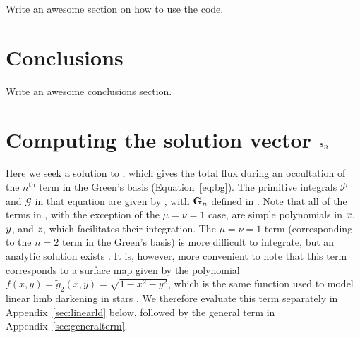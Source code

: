 \documentclass[modern]{aastex61}
\begin{document}
Write an awesome section on how to use the code.

%


\pagebreak
\section{Conclusions}
\label{sec:conclusions}

Write an awesome conclusions section.

%


\pagebreak
\appendix
\section{Computing the solution vector $\MakeLowercase{s_n}$}
\label{sec:solutionvector}

Here we seek a solution to , which gives the total flux
during an occultation of the $n^\mathrm{th}$ term in the Green's basis
(Equation~\ref{eq:bg}). The primitive integrals $\mathcal{P}$ and
$\mathcal{G}$ in that equation are given by , with
${\mathbf{G}}_n$ defined in . Note that all of the terms in ,
with the exception of the $\mu = \nu = 1$ case, are simple polynomials
in $\mbox{$x$}$, $\mbox{$y$}$, and $\mbox{$z$}$, which facilitates their integration.
The $\mu = \nu = 1$ term (corresponding to the $n = 2$ term in the Green's basis)
is more difficult to integrate, but an analytic
solution exists \citep{Pal2012}. It is, however, more convenient
to note that this term corresponds to a surface map given by the polynomial
$f(x, y) = \tilde{g}_2(x, y) = \sqrt{1 - x^2 - y^2}$, which is the same function used
to model linear limb darkening in stars \citep{MandelAgol2002}. We therefore
evaluate this term separately in Appendix~\ref{sec:linearld} below, followed by
the general term in Appendix~\ref{sec:generalterm}.
\end{document}
